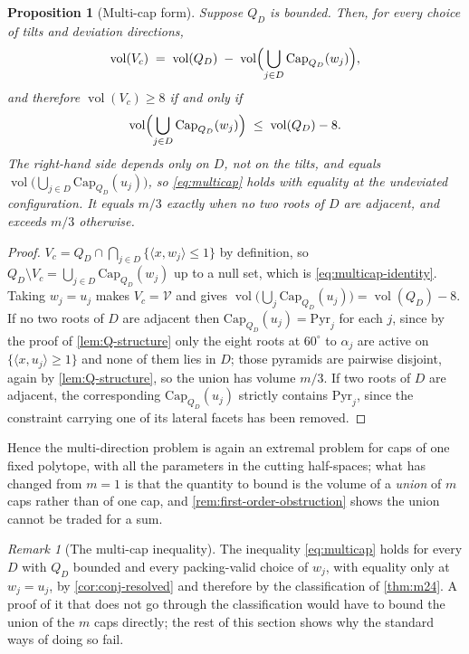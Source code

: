 \documentclass[11pt,reqno]{amsart}
\renewcommand{\_}{\origunderscore\allowbreak}
\numberwithin{equation}{section}
\theoremstyle{plain}
\newtheorem{prop}[thm]{Proposition}
\theoremstyle{definition}
\theoremstyle{remark}
\newtheorem{remark}[thm]{Remark}
\newcommand{\VCell}{\mathcal{V}}             %
\newcommand{\base}{u}                        %
\newcommand{\capQ}{\mathrm{Cap}}             %
\DeclareMathOperator{\vol}{vol}
\begin{document}
\begin{prop}[Multi-cap form]\label{prop:multi-cap}
Suppose $Q_D$ is bounded. Then, for every choice of tilts and deviation
directions,
\begin{equation}\label{eq:multicap-identity}
  \vol(V_c)\;=\;\vol(Q_D)\;-\;\vol\Bigl(\bigcup_{j\in D}\capQ_{Q_D}(w_j)\Bigr),
\end{equation}
and therefore $\vol(V_c)\ge8$ if and only if
\begin{equation}\label{eq:multicap}
  \vol\Bigl(\bigcup_{j\in D}\capQ_{Q_D}(w_j)\Bigr)\;\le\;\vol(Q_D)-8 .
\end{equation}
The right-hand side depends only on $D$, not on the tilts, and equals
$\vol\bigl(\bigcup_{j\in D}\capQ_{Q_D}(\base_j)\bigr)$, so
\eqref{eq:multicap} holds with equality at the undeviated configuration.
It equals $m/3$ exactly when no two roots of $D$ are adjacent, and
exceeds $m/3$ otherwise.
\end{prop}

\begin{proof}
$V_c=Q_D\cap\bigcap_{j\in D}\{\langle x,w_j\rangle\le1\}$ by definition,
so $Q_D\setminus V_c=\bigcup_{j\in D}\capQ_{Q_D}(w_j)$ up to a null set,
which is \eqref{eq:multicap-identity}. Taking $w_j=\base_j$ makes
$V_c=\VCell$ and gives
$\vol\bigl(\bigcup_j\capQ_{Q_D}(\base_j)\bigr)=\vol(Q_D)-8$. If no two
roots of $D$ are adjacent then $\capQ_{Q_D}(\base_j)=\mathrm{Pyr}_j$ for
each $j$, since by the proof of \cref{lem:Q-structure} only the eight
roots at $60^\circ$ to $\alpha_j$ are active on $\{\langle
x,\base_j\rangle\ge1\}$ and none of them lies in $D$; those pyramids are
pairwise disjoint, again by \cref{lem:Q-structure}, so the union has
volume $m/3$. If two roots of $D$ are adjacent, the corresponding
$\capQ_{Q_D}(\base_j)$ strictly contains $\mathrm{Pyr}_j$, since the
constraint carrying one of its lateral facets has been removed.
\end{proof}

Hence the multi-direction problem is again an extremal problem for caps of
one fixed polytope, with all the parameters in the cutting half-spaces;
what has changed from $m=1$ is that the quantity to bound is the volume
of a \emph{union} of $m$ caps rather than of one cap, and
\cref{rem:first-order-obstruction} shows the union cannot be traded for
a sum.

\begin{remark}[The multi-cap inequality]\label{op:multicap}
The inequality \eqref{eq:multicap} holds for every $D$ with $Q_D$ bounded
and every packing-valid choice of $w_j$, with equality only at
$w_j=\base_j$, by \cref{cor:conj-resolved} and therefore by the
classification of \cref{thm:m24}. A proof of it that does not go through
the classification would have to bound the union of the $m$ caps
directly; the rest of this section shows why the standard ways of doing
so fail.
\end{remark}
\end{document}
